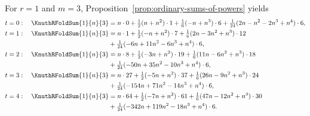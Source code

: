\begin{example}
  For $r=1$ and $m=3$, Proposition~\ref{prop:ordinary-sums-of-powers}
  yields
  \begin{align*}
    t=0:\quad
    \KnuthRFoldSum{1}{n}{3}
    &=
    n\cdot0
    +\tfrac{1}{2}(n+n^2)\cdot1
    +\tfrac{1}{6}(-n+n^3)\cdot6
    +\tfrac{1}{24}(2n-n^2-2n^3+n^4)\cdot6,
    \\
    t=1:\quad
    \KnuthRFoldSum{1}{n}{3}
    &=
    n\cdot1
    +\tfrac{1}{2}(-n+n^2)\cdot7
    +\tfrac{1}{6}(2n-3n^2+n^3)\cdot12 \\
    &+\tfrac{1}{24}(-6n+11n^2-6n^3+n^4)\cdot6,
    \\
    t=2:\quad
    \KnuthRFoldSum{1}{n}{3}
    &=
    n\cdot8
    +\tfrac{1}{2}(-3n+n^2)\cdot19
    +\tfrac{1}{6}(11n-6n^2+n^3)\cdot18 \\
    &+\tfrac{1}{24}(-50n+35n^2-10n^3+n^4)\cdot6,
    \\
    t=3:\quad
    \KnuthRFoldSum{1}{n}{3}
    &=
    n\cdot27
    +\tfrac{1}{2}(-5n+n^2)\cdot37
    +\tfrac{1}{6}(26n-9n^2+n^3)\cdot24 \\
    &+\tfrac{1}{24}(-154n+71n^2-14n^3+n^4)\cdot6,
    \\
    t=4:\quad
    \KnuthRFoldSum{1}{n}{3}
    &=
    n\cdot64
    +\tfrac{1}{2}(-7n+n^2)\cdot61
    +\tfrac{1}{6}(47n-12n^2+n^3)\cdot30 \\
    &+\tfrac{1}{24}(-342n+119n^2-18n^3+n^4)\cdot6.
  \end{align*}
\end{example}

